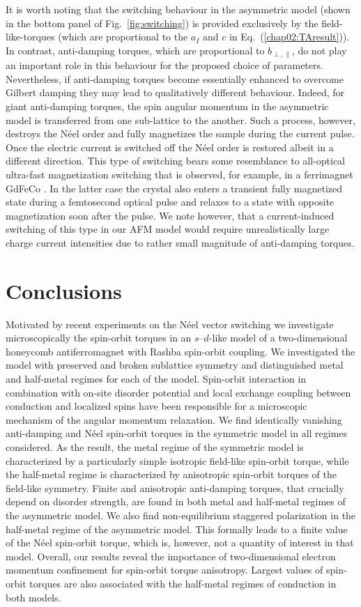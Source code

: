 It is worth noting that the switching behaviour in the asymmetric model (shown in the bottom panel of Fig.~\ref{fig:switching}) is provided exclusively by the field-like-torques (which are proportional to the $a_I$ and $c$ in Eq.~(\ref{chap02:TAresult})). In contrast, anti-damping torques, which are proportional to $b_{\perp,\parallel}$, do not play an important role in this behaviour for the proposed choice of parameters. Nevertheless, if anti-damping torques become essentially enhanced to overcome Gilbert damping they may lead to qualitatively different behaviour. Indeed, for giant anti-damping torques, the spin angular momentum in the asymmetric model is transferred from one sub-lattice to the another. Such a process, however, destroys the N\'eel order and fully magnetizes the sample during the current pulse. Once the electric current is switched off the N\'eel order is restored albeit in a different direction. This type of switching bears some resemblance to all-optical ultra-fast magnetization switching that is observed, for example, in a ferrimagnet GdFeCo \cite{RevModPhys.82.2731}. In the latter case the crystal also enters a transient fully magnetized state during a femtosecond optical pulse and relaxes to a state with opposite magnetization soon after the pulse.  We note however, that a current-induced switching of this type in our AFM model would require unrealistically large charge current intensities due to rather small magnitude of anti-damping torques. 

\section{Conclusions}
 
Motivated by recent experiments on the N\'eel vector switching we investigate microscopically the spin-orbit torques in an $s$--$d$-like model of a two-dimensional honeycomb antiferromagnet with Rashba spin-orbit coupling. We investigated the model with preserved and broken sublattice symmetry and distinguished metal and half-metal regimes for each of the model. Spin-orbit interaction in combination with on-site disorder potential and local exchange coupling between conduction and localized spins have been responsible for a microscopic mechanism of the angular momentum relaxation. We find identically vanishing anti-damping and N\'eel spin-orbit torques in the symmetric model in all regimes considered. As the result, the metal regime of the symmetric model is characterized by a particularly simple isotropic field-like spin-orbit torque, while the half-metal regime is characterized by anisotropic spin-orbit torques of the field-like symmetry.  Finite and anisotropic anti-damping torques, that crucially depend on disorder strength, are found in both metal and half-metal regimes of the asymmetric model. We also find non-equilibrium staggered polarization in the half-metal regime of the asymmetric model. This formally leads to a finite value of the N\'eel spin-orbit torque, which is, however, not a quantity of interest in that model. Overall, our results reveal the importance of two-dimensional electron momentum confinement for spin-orbit torque anisotropy. Largest values of spin-orbit torques are also associated with the half-metal regimes of conduction in both models. 